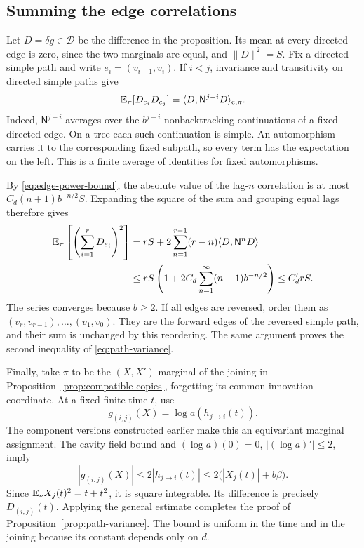 \subsection{Summing the edge correlations}

Let \(D=\delta g\in\mathcal D\) be the difference in the proposition.
Its mean at every directed edge is zero, since the two marginals are
equal, and \(\|D\|^2=S\).  Fix a directed simple path and write
\(e_i=(v_{i-1},v_i)\).  If \(i<j\), invariance and transitivity
on directed simple paths give
\begin{equation}
\label{eq:edge-lag-correlation}
 \mathbb E_\pi[D_{e_i}D_{e_j}]
   =\langle D,\mathsf N^{j-i}D\rangle_{\mathrm e,\pi}.
\end{equation}
Indeed, \(\mathsf N^{j-i}\) averages over the \(b^{j-i}\)
nonbacktracking continuations of a fixed directed edge.  On a tree
each such continuation is simple.  An automorphism carries it to
the corresponding fixed subpath, so every term has the expectation
on the left.  This is a finite average of identities for fixed
automorphisms.

By \eqref{eq:edge-power-bound}, the absolute value of the lag-\(n\)
correlation is at most \(C_d(n+1)b^{-n/2}S\).  Expanding the square
of the sum and grouping equal lags therefore gives
\begin{align*}
 \mathbb E_\pi\left[\left(\sum_{i=1}^rD_{e_i}\right)^2\right]
 &=rS+2\sum_{n=1}^{r-1}(r-n)
                 \langle D,\mathsf N^nD\rangle\\
 &\le rS\left(1+2C_d\sum_{n=1}^\infty(n+1)b^{-n/2}\right)
 \le C'_d rS.
\end{align*}
The series converges because \(b\ge2\).  If all edges are reversed,
order them as
\((v_r,v_{r-1}),\ldots,(v_1,v_0)\).  They are the forward edges
of the reversed simple path, and their sum is unchanged by this
reordering.  The same argument proves the second inequality of
\eqref{eq:path-variance}.

Finally, take \(\pi\) to be the \((X,X')\)-marginal of the joining
in Proposition~\ref{prop:compatible-copies}, forgetting its common
innovation coordinate.  At a fixed finite time \(t\), use
\[
 g_{(i,j)}(X)=\log a(h_{j\to i}(t)).
\]
The component versions constructed earlier make this an equivariant
marginal assignment.  The cavity field bound and
\((\log a)(0)=0\), \(|(\log a)'|\le2\), imply
\[
 |g_{(i,j)}(X)|
 \le2|h_{j\to i}(t)|
 \le2\bigl(|X_j(t)|+b\beta\bigr).
\]
Since \(\mathbb E_\nu X_j(t)^2=t+t^2\), it is square integrable.
Its difference is precisely \(D_{(i,j)}(t)\).  Applying the general
estimate completes the proof of Proposition~\ref{prop:path-variance}.
The bound is uniform in the time and in the joining because its
constant depends only on \(d\).
